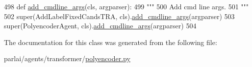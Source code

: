 \begin{DoxyCode}
498     \textcolor{keyword}{def }\hyperlink{namespaceparlai_1_1agents_1_1drqa_1_1config_a62fdd5554f1da6be0cba185271058320}{add\_cmdline\_args}(cls, argparser):
499         \textcolor{stringliteral}{"""}
500 \textcolor{stringliteral}{        Add cmd line args.}
501 \textcolor{stringliteral}{        """}
502         super(AddLabelFixedCandsTRA, cls).\hyperlink{namespaceparlai_1_1agents_1_1drqa_1_1config_a62fdd5554f1da6be0cba185271058320}{add\_cmdline\_args}(argparser)
503         super(PolyencoderAgent, cls).\hyperlink{namespaceparlai_1_1agents_1_1drqa_1_1config_a62fdd5554f1da6be0cba185271058320}{add\_cmdline\_args}(argparser)
504 \end{DoxyCode}


The documentation for this class was generated from the following file\+:\begin{DoxyCompactItemize}
\item 
parlai/agents/transformer/\hyperlink{polyencoder_8py}{polyencoder.\+py}\end{DoxyCompactItemize}
